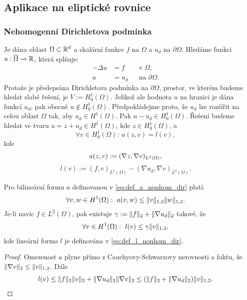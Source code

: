 \subsection{Aplikace na eliptické rovnice}


\subsubsection{Nehomogenní Dirichletova podmínka}

Je dána oblast $\Omega\subset\mathbb R^d$ a skalární funkce $f$ na $\Omega$ a $u_d$ na $\partial\Omega$.
Hledáme funkci $u:\overline\Omega\rightarrow\mathbb R$, která splňuje:
\[ 
\begin{aligned}
    -\Delta u &= f &&\text{v }\Omega,\\
    u&=u_d && \text{na }\partial\Omega.
\end{aligned} 
\]
Protože je předepsána Dirichletova podmínka na $\partial\Omega$, prostor, ve kterém budeme hledat slabé řešení, je $V:=H^1_0(\Omega)$.
Jelikož ale hodnota $u$ na hranici je dána funkcí $u_d$, pak obecně $u\notin H^1_0(\Omega)$.
Předpokládejme proto, že $u_d$ lze rozšířit na celou oblast $\Omega$ tak, aby $u_d\in H^1(\Omega)$.
Pak $u-u_d\in H^1_0(\Omega)$.
Řešení budeme hledat ve tvaru $u=z+u_d\in H^1(\Omega)$, kde $z\in H^1_0(\Omega)$, a
\[ 
    \forall v\in H^1_0(\Omega):\ a(z,v)=l(v), 
\]
kde
\begin{equation}\label{eq:def_a_nonhom_dir}
    a(z,v) := (\nabla z, \nabla v)_{L^2(\Omega)},
\end{equation}
\begin{equation}\label{eq:def_l_nonhom_dir}
    l(v) := (f,v)_{L^2(\Omega)} - (\nabla u_d,\nabla v)_{L^2(\Omega)}.
\end{equation}
\begin{veta}
    Pro bilineární formu $a$ definovanou v \eqref{eq:def_a_nonhom_dir} platí:
    \[ \forall v,w\in H^1(\Omega):~a(v,w) \le \|v\|_{1,2}\|w\|_{1,2}. \]
    Je-li navíc $f\in L^2(\Omega)$, pak existuje $\gamma:=\|f\|_2+\|\nabla u_d\|_2$ takové, že
    \[ \forall v\in H^1(\Omega):~l(v) \le \gamma\|v\|_{1,2}, \]
    kde lineární forma $l$ je definována v \eqref{eq:def_l_nonhom_dir}.
\end{veta}
\begin{proof}
    Omezenost $a$ plyne přímo z Cauchyovy-Schwarzovy nerovnosti a faktu, že $\|\nabla v\|_2\le\|v\|_{1,2}$.
    Dále
    \[ l(v)\le \|f\|_2\|v\|_2 + \|\nabla u_d\|_2\|\nabla v\|_2
    \le (\|f\|_2+\|\nabla u_d\|_2)\|v\|_{1,2}. \]
\end{proof}


